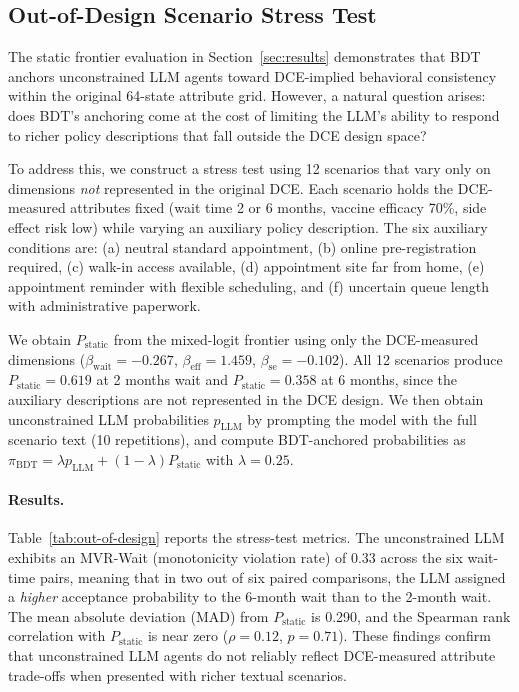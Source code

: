 \subsection{Out-of-Design Scenario Stress Test}
\label{sec:out-of-design-stress}

The static frontier evaluation in Section~\ref{sec:results} demonstrates that BDT anchors unconstrained LLM agents toward DCE-implied behavioral consistency within the original 64-state attribute grid. However, a natural question arises: does BDT's anchoring come at the cost of limiting the LLM's ability to respond to richer policy descriptions that fall outside the DCE design space?

To address this, we construct a stress test using 12 scenarios that vary only on dimensions \emph{not} represented in the original DCE. Each scenario holds the DCE-measured attributes fixed (wait time 2 or 6 months, vaccine efficacy 70\%, side effect risk low) while varying an auxiliary policy description. The six auxiliary conditions are: (a) neutral standard appointment, (b) online pre-registration required, (c) walk-in access available, (d) appointment site far from home, (e) appointment reminder with flexible scheduling, and (f) uncertain queue length with administrative paperwork.

We obtain $P_{\mathrm{static}}$ from the mixed-logit frontier using only the DCE-measured dimensions ($\beta_{\mathrm{wait}} = -0.267$, $\beta_{\mathrm{eff}} = 1.459$, $\beta_{\mathrm{se}} = -0.102$). All 12 scenarios produce $P_{\mathrm{static}} = 0.619$ at 2 months wait and $P_{\mathrm{static}} = 0.358$ at 6 months, since the auxiliary descriptions are not represented in the DCE design. We then obtain unconstrained LLM probabilities $p_{\mathrm{LLM}}$ by prompting the model with the full scenario text (10 repetitions), and compute BDT-anchored probabilities as $\pi_{\mathrm{BDT}} = \lambda p_{\mathrm{LLM}} + (1 - \lambda) P_{\mathrm{static}}$ with $\lambda = 0.25$.

\paragraph{Results.}
Table~\ref{tab:out-of-design} reports the stress-test metrics. The unconstrained LLM exhibits an MVR-Wait (monotonicity violation rate) of 0.33 across the six wait-time pairs, meaning that in two out of six paired comparisons, the LLM assigned a \emph{higher} acceptance probability to the 6-month wait than to the 2-month wait. The mean absolute deviation (MAD) from $P_{\mathrm{static}}$ is 0.290, and the Spearman rank correlation with $P_{\mathrm{static}}$ is near zero ($\rho = 0.12$, $p = 0.71$). These findings confirm that unconstrained LLM agents do not reliably reflect DCE-measured attribute trade-offs when presented with richer textual scenarios.

